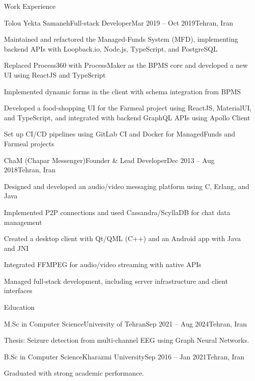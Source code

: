 \documentclass[]{main}
\begin{document}
\begin{section}{Work Experience}
 \begin{subsection}{Tolou Yekta Samaneh}{Full-stack Developer}{Mar 2019 -- Oct 2019}{Tehran, Iran}
     \item Maintained and refactored the Managed-Funds System (MFD), implementing backend APIs with Loopback.io, Node.js, TypeScript, and PostgreSQL
     \item Replaced Process360 with ProcessMaker as the BPMS core and developed a new UI using ReactJS and TypeScript
     \item Implemented dynamic forms in the client with schema integration from BPMS
     \item Developed a food-shopping UI for the Farmeal project using ReactJS, MaterialUI, and TypeScript, and integrated with backend GraphQL APIs using Apollo Client
     \item Set up CI/CD pipelines using GitLab CI and Docker for ManagedFunds and Farmeal projects
 \end{subsection}

 \begin{subsection}{ChaM (Chapar Messenger)}{Founder \& Lead Developer}{Dec 2013 -- Aug 2018}{Tehran, Iran}
     \item Designed and developed an audio/video messaging platform using C, Erlang, and Java
     \item Implemented P2P connections and used Cassandra/ScyllaDB for chat data management
     \item Created a desktop client with Qt/QML (C++) and an Android app with Java and JNI
     \item Integrated FFMPEG for audio/video streaming with native APIs
     \item Managed full-stack development, including server infrastructure and client interfaces
 \end{subsection}
\end{section}

\begin{section}{Education}
 \begin{subsectionnobullet}{M.Sc in Computer Science}{University of Tehran}{Sep 2021 -- Aug 2024}{Tehran, Iran}
     \item Thesis: Seizure detection from multi-channel EEG using Graph Neural Networks.
 \end{subsectionnobullet}
 \begin{subsectionnobullet}{B.Sc in Computer Science}{Kharazmi University}{Sep 2016 -- Jan 2021}{Tehran, Iran}
     \item Graduated with strong academic performance.
 \end{subsectionnobullet}
\end{section}
\end{document}
